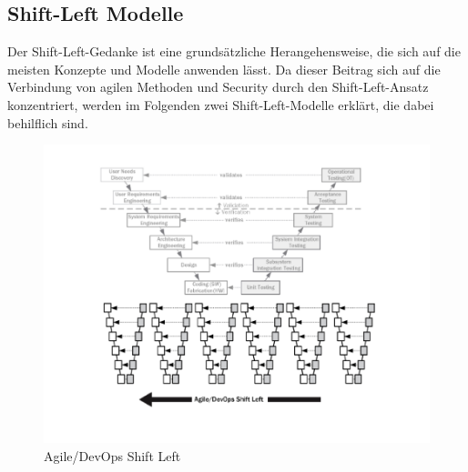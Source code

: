 \subsection{Shift-Left Modelle}
\label{sec:arten}
Der Shift-Left-Gedanke ist eine grundsätzliche Herangehensweise, die sich auf die meisten Konzepte und Modelle anwenden lässt. Da dieser Beitrag sich auf die Verbindung von agilen Methoden und Security durch den Shift-Left-Ansatz konzentriert, werden im Folgenden zwei Shift-Left-Modelle erklärt, die dabei behilflich sind.

\begin{figure}
    \centering
    \includegraphics[width=0.9\linewidth]{images/Agile_DevOps_Shift_Left.png}
    \caption{Agile/DevOps Shift Left \cite{firesmith_four_2015}}
    \label{fig:agiledevops}
\end{figure}

